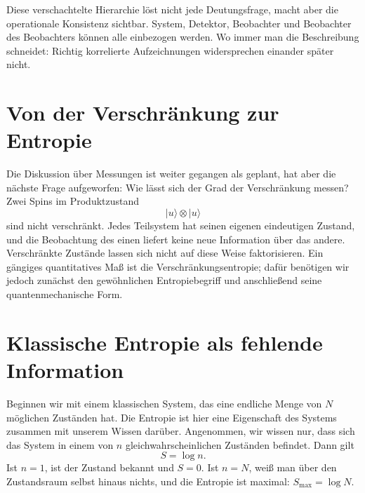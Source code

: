 \begin{classroomqa}
\end{classroomqa}

Diese verschachtelte Hierarchie löst nicht jede Deutungsfrage, macht aber die operationale Konsistenz sichtbar. System, Detektor, Beobachter und Beobachter des Beobachters können alle einbezogen werden. Wo immer man die Beschreibung schneidet: Richtig korrelierte Aufzeichnungen widersprechen einander später nicht.

\section{Von der Verschränkung zur Entropie}

Die Diskussion über Messungen ist weiter gegangen als geplant, hat aber die nächste Frage aufgeworfen: Wie lässt sich der Grad der Verschränkung messen? Zwei Spins im Produktzustand
\begin{equation}
|u\rangle\otimes|u\rangle
\end{equation}
sind nicht verschränkt. Jedes Teilsystem hat seinen eigenen eindeutigen Zustand, und die Beobachtung des einen liefert keine neue Information über das andere. Verschränkte Zustände lassen sich nicht auf diese Weise faktorisieren. Ein gängiges quantitatives Maß ist die Verschränkungsentropie; dafür benötigen wir jedoch zunächst den gewöhnlichen Entropiebegriff und anschließend seine quantenmechanische Form.

\section{Klassische Entropie als fehlende Information}

Beginnen wir mit einem klassischen System, das eine endliche Menge von \(N\) möglichen Zuständen hat. Die Entropie ist hier eine Eigenschaft des Systems zusammen mit unserem Wissen darüber. Angenommen, wir wissen nur, dass sich das System in einem von \(n\) gleichwahrscheinlichen Zuständen befindet. Dann gilt
\begin{equation}
S=\log n.
\end{equation}
Ist \(n=1\), ist der Zustand bekannt und \(S=0\). Ist \(n=N\), weiß man über den Zustandsraum selbst hinaus nichts, und die Entropie ist maximal: \(S_{\max}=\log N\).

